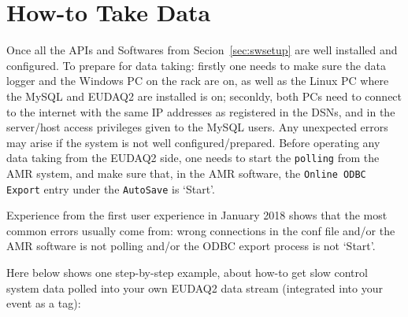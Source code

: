 \documentclass[a4paper,12pt]{scrartcl}
\begin{document}
\section{How-to Take Data}
Once all the APIs and Softwares from Secion~\ref{sec:swsetup} are well installed and configured. To prepare for data taking: firstly one needs to make sure the data logger and the Windows PC on the rack are on, as well as the Linux PC where the MySQL and EUDAQ2 are installed is on; seconldy, both PCs need to connect to the internet with the same IP addresses as registered in the DSNs, and in the server/host access privileges given to the MySQL users. Any unexpected errors may arise if the system is not well configured/prepared. Before operating any data taking from the EUDAQ2 side, one needs to start the \texttt{polling} from the AMR system, and make sure that, in the AMR software, the \texttt{Online ODBC Export} entry under the \texttt{AutoSave} is `Start'.

Experience from the first user experience in January 2018 shows that the most common errors usually come from: wrong connections in the conf file and/or the AMR software is not polling and/or the ODBC export process is not `Start'.

Here below shows one step-by-step example, about how-to get slow control system data polled into your own EUDAQ2 data stream (integrated into your event as a tag):
\end{document}
